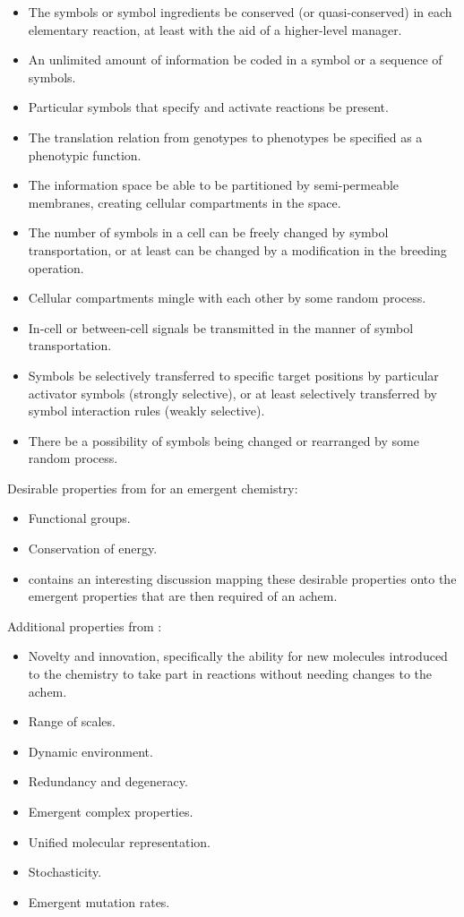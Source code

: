\begin{itemize}
	\item
	The symbols or symbol ingredients be conserved (or quasi-conserved) in each elementary reaction, at least with the aid of a higher-level manager.
	\item
	An unlimited amount of information be coded in a symbol or a sequence of symbols.
	\item
	Particular symbols that specify and activate reactions be present.
	\item
	The translation relation from genotypes to phenotypes be specified as a phenotypic function.
	\item
	The information space be able to be partitioned by semi-permeable membranes, creating cellular compartments in the space.
	\item
	The number of symbols in a cell can be freely changed by symbol transportation, or at least can be changed by a modification in the breeding operation.
	\item
	Cellular compartments mingle with each other by some random process.
	\item
	In-cell or between-cell signals be transmitted in the manner of symbol transportation.
	\item
	Symbols be selectively transferred to specific target positions by particular activator symbols (strongly selective), or at least selectively transferred by symbol interaction rules (weakly selective).
	\item
	There be a possibility of symbols being changed or rearranged by some random process.
\end{itemize}

Desirable properties from \autocite{Faulconbridge2011} for an emergent chemistry:

\begin{itemize}
	\item
	Functional groups.
	\item
	Conservation of energy.
	\item
	\autocite[sec.4.4]{Faulconbridge2011} contains an interesting discussion mapping these desirable properties onto the emergent properties that are then required of an \gls{achem}.
\end{itemize}

Additional properties from \autocite{Hickinbotham2010}:

\begin{itemize}
	\item
	Novelty and innovation, specifically the ability for new molecules introduced to the chemistry to take part in reactions without needing changes to the \gls{achem}.
	\item
	Range of scales.
	\item
	Dynamic environment.
	\item
	Redundancy and degeneracy.
	\item
	Emergent complex properties.
	\item
	Unified molecular representation.
	\item
	Stochasticity.
	\item
	Emergent mutation rates.
\end{itemize}


